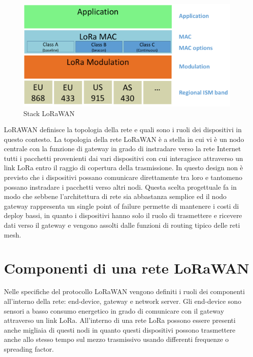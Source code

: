 \documentclass[12pt,a4paper,openright,twoside]{report}
\begin{document}
\begin{figure}[h]                      
\begin{center} 
\includegraphics[width=\textwidth]{lorawan_protocolo_stack.png}
\caption[Stack LoRaWAN]{Stack LoRaWAN} \label{fig:venti}
\end{center}
\end{figure}
LoRAWAN definisce la topologia della rete e quali sono i ruoli dei dispositivi in questo contesto. 
La topologia della rete LoRaWAN \`e a stella in cui vi \`e un nodo centrale con la funzione di gateway in grado di instradare verso la rete Internet tutti i pacchetti provenienti dai vari dispositivi con cui interagisce attraverso un link LoRa entro il raggio di copertura della trasmissione. In questo design non \`e previsto che i dispositivi possano comunicare direttamente tra loro e tantomeno possano instradare i pacchetti verso altri nodi. Questa scelta progettuale fa in modo che sebbene l'architettura di rete sia abbastanza semplice ed il nodo gateway rappresenta un single point of failure permette di mantenere i costi di deploy bassi, in quanto i dispositivi hanno solo il ruolo di trasmettere e ricevere dati verso il gateway e vengono assolti dalle funzioni di routing tipico delle reti mesh. 

\section{Componenti di una rete LoRaWAN}
Nelle specifiche del protocollo LoRaWAN vengono definiti i ruoli dei componenti all'interno della rete: end-device, gateway e network server.
Gli end-device sono sensori a basso consumo energetico in grado di comunicare con il gateway attraverso un link LoRa. All'interno di una rete LoRa possono essere presenti anche migliaia di questi nodi in quanto questi dispositivi possono trasmettere anche allo stesso tempo sul mezzo trasmissivo usando differenti frequenze o spreading factor.
\end{document}
